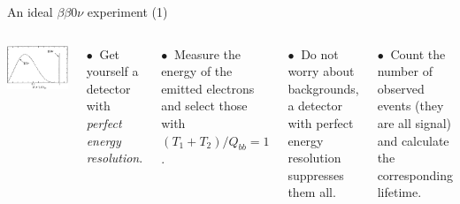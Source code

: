 \documentclass [aspectratio=169]{beamer}
\begin{document}

\begin{frame}{An ideal ${\beta\beta0\nu}$ experiment (1)}

\begin{columns}
\includegraphics[scale=0.43]{idealdet.png}


$\bullet~$ Get yourself a detector with {\em perfect energy resolution}. 

$\bullet~$ Measure the energy of the emitted electrons and select those with 
$(T_1+T_2)/Q_{bb} = 1$.

$\bullet~$ Do not worry about backgrounds, a detector with perfect energy resolution suppresses them all. 

$\bullet~$ Count the number of observed events (they are all signal) and calculate the corresponding lifetime.

\end{columns}
\end{frame}

\end{document}
